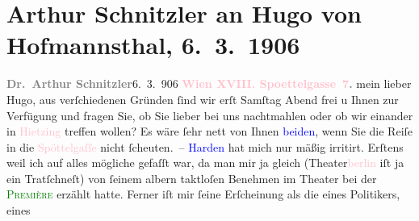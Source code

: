 

               \section[Arthur Schnitzler an Hugo von Hofmannsthal, 6. 3. 1906]{ Arthur Schnitzler an Hugo von Hofmannsthal, 6. 3. 1906}\nopagebreak{}\rehead{ }\normalsize\beginnumbering{} \toendnotes[C]{\smallbreak\pagebreak[2]} 
\toendnotes[C]{\smallbreak}\pstart
           {\pb}\textcolor{gray}{\textbf{Dr. Arthur Schnitzler}}\hfill 6. 3. 906\pend
           \pstart
           \textcolor{gray}{\textbf{\textcolor{pink}{Wien XVIII. Spoettelgasse 7}{}\ledrightnote{\textcolor{pink}{Edmund-Weiß-Gasse}}.}}\pend
           \pstart{}mein lieber Hugo, \pend\pstart
           aus verſchiedenen Gründen ſind wir erſt Samſtag Abend frei u Ihnen zur
               Verfügung und fragen Sie, ob Sie lieber bei uns nachtmahlen  oder ob wir einander in \textcolor{pink}{Hietzing}{}\ledrightnote{\textcolor{pink}{XIII., Hietzing}}
               treffen wollen? Es wäre ſehr nett von Ihnen \textcolor{blue}{beiden}{}, wenn Sie die Reiſe in die \textcolor{pink}{Spöttelgaſſe}{}\ledrightnote{\textcolor{pink}{Edmund-Weiß-Gasse}} nicht ſcheuten. –\pend
           \pstart
           {\pb}\textcolor{blue}{Harden}{}\ledrightnote{\textcolor{blue}{Maximilian Harden}} hat mich nur mäßig irritirt. Erſtens weil
               ich auf alles mögliche gefaſſt war, da man mir ja gleich (Theater\textcolor{pink}{berlin}{}\ledrightnote{\textcolor{pink}{Berlin}} iſt ja ein Tratſchneſt) von ſeinem albern taktloſen
               Benehmen im Theater bei der \textcolor{green}{\textsc{Première}}{} erzählt hatte. Ferner iſt mir ſeine Erſcheinung als die eines Politikers, eines
